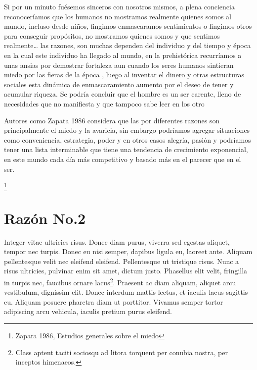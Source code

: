 \documentclass[11pt,letterpaper]{article}
\begin{document}


Si por un minuto fuésemos sinceros con nosotros mismos, a plena conciencia reconoceríamos que  los humanos no mostramos realmente quienes somos al mundo, incluso desde niños, fingimos enmascaramos sentimientos o fingimos otros para conseguir propósitos, no mostramos quienes somos y que sentimos realmente… las razones, son muchas dependen del individuo y del tiempo y época en la cual este individuo ha llegado al mundo, en la prehistórica recurríamos a unas ansias por demostrar fortaleza aun cuando los seres humanos sintieran miedo por las fieras de la época , luego al inventar el dinero y otras estructuras sociales esta dinámica de enmascaramiento aumento por el deseo de tener y acumular riqueza. Se podría concluir que el hombre es un ser carente, lleno de necesidades que no manifiesta y que tampoco sabe leer en los otro

Autores como Zapata 1986 considera que las  por diferentes razones son principalmente el miedo y la avaricia, sin embargo podríamos agregar situaciones como  conveniencia,  estrategia,  poder y en otros casos  alegría, pasión y podríamos tener una lista interminable que tiene una tendencia de crecimiento exponencial, en este mundo cada día más competitivo y basado más en el parecer que en el ser.  

\footnote{Zapara 1986, Estudios generales sobre el miedo} 



\section{Razón No.2}

Integer vitae ultricies risus. Donec diam purus, viverra sed egestas aliquet, tempor nec turpis. Donec eu nisi semper, dapibus ligula eu, laoreet ante. Aliquam pellentesque velit nec eleifend eleifend. Pellentesque ut tristique risus. Nunc a risus ultricies, pulvinar enim sit amet, dictum justo. Phasellus elit velit, fringilla in turpis nec, faucibus ornare lacus\footnote{Class aptent taciti sociosqu ad litora torquent per conubia nostra, per inceptos himenaeos.}. Praesent ac diam aliquam, aliquet arcu vestibulum, dignissim elit. Donec interdum mattis lectus, et iaculis lacus sagittis eu. Aliquam posuere pharetra diam ut porttitor. Vivamus semper tortor adipiscing arcu vehicula, iaculis pretium purus eleifend.
\end{document}
